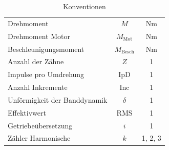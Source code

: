 \begin{table}[H]
\begin{tabular}{l|c|c}
    Drehmoment 						& $M$ 				& $\si{\N\m}$\\
	Drehmoment Motor				& $M_\mathrm{Mot}$ 	& $\si{\N\m}$\\
	Beschleunigungsmoment 			& $M_\mathrm{Besch}$& $\si{\N\m}$\\
    Anzahl der Zähne 				& $Z$ 				& 1\\
	Impulse pro Umdrehung 			& IpD 				& 1\\
	Anzahl Inkremente 				& Inc 				& 1\\
    Unförmigkeit der Banddynamik 	& $\delta$ 			& 1\\
	Effektivwert 					& RMS 				& 1\\
	Getriebeübersetzung 			& $i$ 				& 1\\
	Zähler Harmonische 				& $k$ 				& 1, 2, 3\\
\end{tabular}
\caption{Konventionen}
\label{tab:Konventionen}
\end{table}

